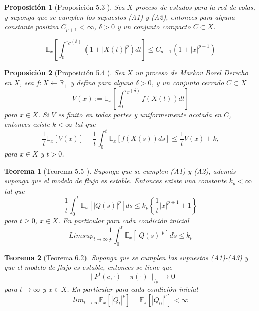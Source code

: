 \documentclass{article}
\newtheorem{Teo}{Teorema}[section]
\newtheorem{Prop}{Proposición}[section]
\newcommand{\rea}{\mathbb{R}}
\newcommand{\esp}{\mathbb{E}}
\numberwithin{equation}{section}
\begin{document}
\begin{Prop}[Proposici\'on 5.3 \cite{DaiSean}]
Sea $X$ proceso de estados para la red de colas, y suponga que se cumplen los supuestos (A1) y (A2), entonces para alguna constante positiva $C_{p+1}<\infty$, $\delta>0$ y un conjunto compacto $C\subset X$.

\begin{equation}\label{Eq.5.4}
\esp_{x}\left[\int_{0}^{\tau_{C}\left(\delta\right)}\left(1+|X\left(t\right)|^{p}\right)dt\right]\leq C_{p+1}\left(1+|x|^{p+1}\right)
\end{equation}
\end{Prop}

\begin{Prop}[Proposici\'on 5.4 \cite{DaiSean}]
Sea $X$ un proceso de Markov Borel Derecho en $X$, sea $f:X\leftarrow\rea_{+}$ y defina para alguna $\delta>0$, y un conjunto cerrado $C\subset X$
\[V\left(x\right):=\esp_{x}\left[\int_{0}^{\tau_{C}\left(\delta\right)}f\left(X\left(t\right)\right)dt\right]\]
para $x\in X$. Si $V$ es finito en todas partes y uniformemente acotada en $C$, entonces existe $k<\infty$ tal que
\begin{equation}\label{Eq.5.11}
\frac{1}{t}\esp_{x}\left[V\left(x\right)\right]+\frac{1}{t}\int_{0}^{t}\esp_{x}\left[f\left(X\left(s\right)\right)ds\right]\leq\frac{1}{t}V\left(x\right)+k,
\end{equation}
para $x\in X$ y $t>0$.
\end{Prop}


\begin{Teo}[Teorema 5.5 \cite{DaiSean}]
Suponga que se cumplen (A1) y (A2), adem\'as suponga que el modelo de flujo es estable. Entonces existe una constante $k_{p}<\infty$ tal que
\begin{equation}\label{Eq.5.13}
\frac{1}{t}\int_{0}^{t}\esp_{x}\left[|Q\left(s\right)|^{p}\right]ds\leq k_{p}\left\{\frac{1}{t}|x|^{p+1}+1\right\}
\end{equation}
para $t\geq0$, $x\in X$. En particular para cada condici\'on inicial
\begin{equation}\label{Eq.5.14}
Limsup_{t\rightarrow\infty}\frac{1}{t}\int_{0}^{t}\esp_{x}\left[|Q\left(s\right)|^{p}\right]ds\leq k_{p}
\end{equation}
\end{Teo}

\begin{Teo}[Teorema 6.2\cite{DaiSean}]\label{Tma.6.2}
Suponga que se cumplen los supuestos (A1)-(A3) y que el modelo de flujo es estable, entonces se tiene que
\[\parallel P^{t}\left(c,\cdot\right)-\pi\left(\cdot\right)\parallel_{f_{p}}\rightarrow0\]
para $t\rightarrow\infty$ y $x\in X$. En particular para cada condici\'on inicial \[lim_{t\rightarrow\infty}\esp_{x}\left[\left|Q_{t}\right|^{p}\right]=\esp_{\pi}\left[\left|Q_{0}\right|^{p}\right]<\infty\]
\end{Teo}
\end{document}
